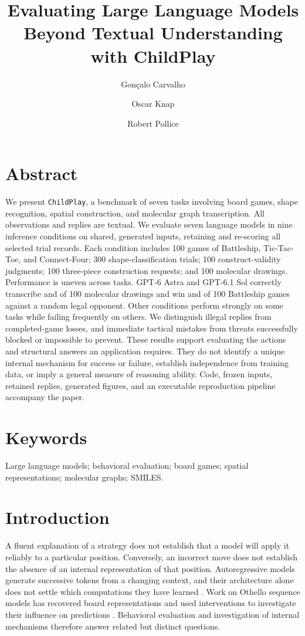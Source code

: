 \documentclass[12pt,letterpaper]{article}
\title{Evaluating Large Language Models Beyond Textual Understanding with ChildPlay}
\date{}
\author[1,2,3,*,\orcidlink{0000-0001-8776-4852}]{Gonçalo Carvalho}
\author[1,2]{Oscar Knap}
\author[1,2,\orcidlink{0000-0001-8836-6266}]{Robert Pollice}
\affil[1]{Stratingh Institute for Chemistry, University of Groningen, Nijenborgh 3, 9747 AG Groningen, The Netherlands.}
\affil[2]{These authors contributed equally}
\affil[3]{\protect\href{https://hellolupa.com}{Lupa Labs}, Friedensgasse 7, 8001 Zurich, Switzerland.}
\affil[*]{Correspondence: goncalo@hellolupa.com}
\makeatletter
\renewcommand{\maketitle}{\bgroup\setlength{\parindent}{0pt}
\begin{flushleft}
  \textbf{\@title}
  
  \@author
\end{flushleft}\egroup}
\makeatother
\begin{document}
\maketitle


\section*{Abstract}
We present \texttt{ChildPlay}, a benchmark of seven tasks involving board games, shape recognition, spatial construction, and molecular graph transcription. All observations and replies are textual. We evaluate seven language models in nine inference conditions on shared, generated inputs, retaining and re-scoring all \NumRecords{} selected trial records. Each condition includes 100 games of Battleship, Tic-Tac-Toe, and Connect-Four; 300 shape-classification trials; 100 construct-validity judgments; 100 three-piece construction requests; and 100 molecular drawings. Performance is uneven across tasks. GPT-6 Astra and GPT-6.1 Sol correctly transcribe \AstraGts{} and \SolGts{} of 100 molecular drawings and win \AstraBs{} and \SolBs{} of 100 Battleship games against a random legal opponent. Other conditions perform strongly on some tasks while failing frequently on others. We distinguish illegal replies from completed-game losses, and immediate tactical mistakes from threats successfully blocked or impossible to prevent. These results support evaluating the actions and structural answers an application requires. They do not identify a unique internal mechanism for success or failure, establish independence from training data, or imply a general measure of reasoning ability. Code, frozen inputs, retained replies, generated figures, and an executable reproduction pipeline accompany the paper.

\section*{Keywords}
Large language models; behavioral evaluation; board games; spatial representations; molecular graphs; SMILES.

\section*{Introduction}
A fluent explanation of a strategy does not establish that a model will apply it reliably to a particular position. Conversely, an incorrect move does not establish the absence of an internal representation of that position. Autoregressive models generate successive tokens from a changing context, and their architecture alone does not settle which computations they have learned \cite{vaswani2023attention,brown}. Work on Othello sequence models has recovered board representations and used interventions to investigate their influence on predictions \cite{li2023emergent,nanda2023linear}. Behavioral evaluation and investigation of internal mechanisms therefore answer related but distinct questions.
\end{document}
